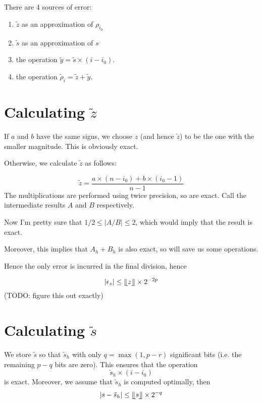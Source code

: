 \documentclass{article}
\begin{document}
There are 4 sources of error:
\begin{enumerate}
\item $\tilde z$ as an approximation of $\rho_{i_0}$
\item $\tilde s$ as an approximation of $s$
\item the operation $ \tilde y = \tilde s \times (i-i_0)$.
\item the operation $ \tilde \rho_i = \tilde z + \tilde y$.
\end{enumerate}

\section{Calculating $\tilde z$}
\label{sec:calculating-tilde-z}

If $a$ and $b$ have the same signs, we choose $z$ (and hence $\tilde z$) to be the one with the smaller magnitude. This is obviously exact.

Otherwise, we calculate $\tilde z$ as follows:

\begin{equation*}
  \tilde z = \frac{a \times (n-i_0) + b \times (i_0 - 1)}{n-1}
\end{equation*}
The multiplications are performed using twice precision, so are exact. Call the intermediate results $A$ and $B$ respectively.

Now I'm pretty sure that $1/2 \leq |A/B| \leq 2$, which would imply that the result is exact.

Moreover, this implies that $A_h + B_h$ is also exact, so will save us some operations.

Hence the only error is incurred in the final division, hence

\begin{equation*}
|\epsilon_z| \leq \llfloor z \rrfloor \times 2^{-2p} 
\end{equation*}
(TODO: figure this out exactly)



\section{Calculating $\tilde s$}
\label{sec:calculating-tilde-s}

We store $\tilde s$ so that $\tilde s_h$ with only $q = \max(1, p-r)$ significant bits (i.e. the remaining $p-q$ bits are zero). This ensures that the operation
\begin{equation*}
  \tilde s_h \times (i - i_0)
\end{equation*}
is exact. Moreover, we assume that $\tilde s_h$ is computed optimally, then
\begin{equation*}
  |s - \tilde s_h| \leq \llfloor s \rrfloor \times 2^{-q}
\end{equation*}
\end{document}
